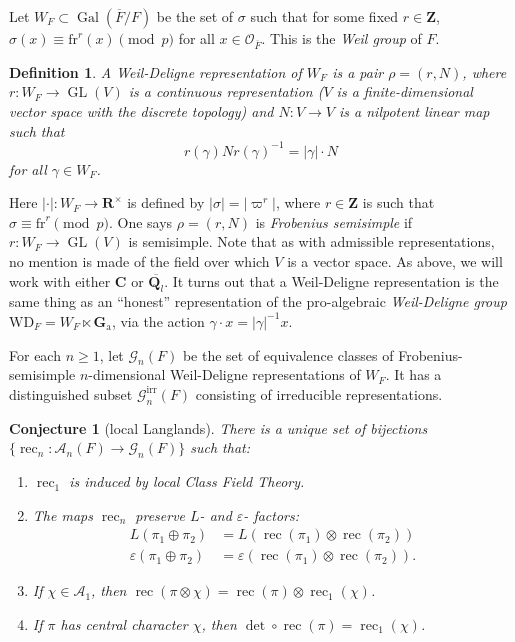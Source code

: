 \documentclass{article}
\DeclareMathOperator{\galois}{Gal}
\DeclareMathOperator{\GL}{GL}
\DeclareMathOperator{\reciprocity}{rec}
\newcommand{\frob}{\mathrm{fr}} %
\newcommand{\Ga}{\mathbf{G}_\mathrm{a}}
\newcommand{\WD}{\mathrm{WD}} %
\newcommand{\cA}{\mathcal{A}}
\newcommand{\cG}{\mathcal{G}}
\newcommand{\cO}{\mathcal{O}}
\newcommand{\dC}{\mathbf{C}}
\newcommand{\dQ}{\mathbf{Q}}
\newcommand{\dR}{\mathbf{R}}
\newcommand{\dZ}{\mathbf{Z}}
\newtheorem{conjecture}[subsection]{Conjecture}
\newtheorem{definition}[subsection]{Definition}
\begin{document}
Let $W_F\subset\galois(\overline F/F)$ be the set of $\sigma$ such that 
for some fixed $r\in \dZ$, $\sigma(x)\equiv \frob^r(x)\pmod p$ for all 
$x\in \cO_{\overline F}$. This is the \emph{Weil group} of $F$. 

\begin{definition}
A \emph{Weil-Deligne representation} of $W_F$ is a pair $\rho=(r,N)$, where 
$r:W_F\to \GL(V)$ is a continuous representation ($V$ is a finite-dimensional 
vector space with the discrete topology) and $N:V\to V$ is a nilpotent linear 
map such that 
\[
  r(\gamma) N r(\gamma)^{-1} = |\gamma|\cdot N 
\]
for all $\gamma\in W_F$. 
\end{definition}

Here $|\cdot|:W_F\to \dR^\times$ is defined by $|\sigma|=|\varpi^r|$, where 
$r\in \dZ$ is such that $\sigma\equiv \frob^r\pmod p$. One says 
$\rho=(r,N)$ is \emph{Frobenius semisimple} if $r:W_F\to \GL(V)$ is semisimple. 
Note that as with admissible representations, no mention is made of the field 
over which $V$ is a vector space. As above, we will work with either $\dC$ or 
$\overline{\dQ_l}$. It turns out that a Weil-Deligne representation is the same 
thing as an ``honest'' representation of the pro-algebraic \emph{Weil-Deligne 
group} $\WD_F=W_F\ltimes \Ga$, via the action 
$\gamma\cdot x = |\gamma|^{-1} x$. 

For each $n\geqslant 1$, let $\cG_n(F)$ be the set of equivalence classes of 
Frobenius-semisimple $n$-dimensional Weil-Deligne representations of $W_F$. It 
has a distinguished subset $\cG_n^\mathrm{irr}(F)$ consisting of irreducible 
representations. 

\begin{conjecture}[local Langlands]\label{conj:local-langlands}
There is a unique set of bijections $\{\reciprocity_n:\cA_n(F)\to \cG_n(F)\}$ 
such that: 
\begin{enumerate}
\item $\reciprocity_1$ is induced by local Class Field Theory. 

\item The maps $\reciprocity_n$ preserve $L$- and $\varepsilon$- factors: 
\begin{align*}
  L(\pi_1\oplus \pi_2) 
    &= L(\reciprocity(\pi_1)\otimes \reciprocity(\pi_2)) \\
  \varepsilon(\pi_1\oplus \pi_2) 
    &= \varepsilon(\reciprocity(\pi_1)\otimes \reciprocity(\pi_2)) .
\end{align*}

\item If $\chi\in \cA_1$, then 
$\reciprocity(\pi\otimes \chi)=\reciprocity(\pi)\otimes \reciprocity_1(\chi)$. 

\item If $\pi$ has central character $\chi$, then 
$\det\circ \reciprocity(\pi) = \reciprocity_1(\chi)$. 
\end{enumerate}
\end{conjecture}
\end{document}
